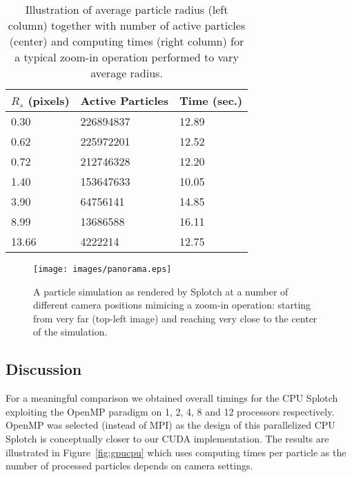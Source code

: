 \documentclass[1p]{elsarticle}
\begin{document}
\begin{table}
\begin{center}
\begin{tabular}{|l|l|l|}
\hline
$R_s$ (pixels) & Active Particles & Time (sec.) \\
\hline
0.30   & 226894837  & 12.89 \\
\hline
0.62   & 225972201  & 12.52 \\
\hline
0.72   & 212746328  & 12.20 \\
\hline
1.40   & 153647633  & 10.05 \\
\hline
3.90   & 64756141   & 14.85 \\
\hline
8.99   & 13686588   & 16.11 \\
\hline
13.66  & 4222214    & 12.75 \\
\hline
\end{tabular}
\end{center}
\caption{Illustration of average particle radius (left column) together with number of active particles (center)
and computing times (right column) for a typical zoom-in operation performed to vary average radius.}
\label{tab:radius}
\end{table}

\begin{figure}
\centering
\texttt{[image: images/panorama.eps]}
\caption{A particle simulation as rendered by Splotch at a number of different camera positions mimicing a zoom-in operation: starting from very far (top-left image) and reaching very close to the center of the simulation.}
\label{fig:panorama}
\end{figure}
\subsection{Discussion}
\label{sec:discussion}
For a meaningful comparison we obtained overall timings for the CPU Splotch exploiting the OpenMP paradigm on 1, 2, 4, 8 and 12 processors respectively. OpenMP was selected (instead of MPI) as the design of this parallelized CPU Splotch is conceptually closer to our CUDA implementation. The results are illustrated in Figure~\ref{fig:gpucpu} which uses computing times per particle as the number of processed particles depends on camera settings.
\end{document}
